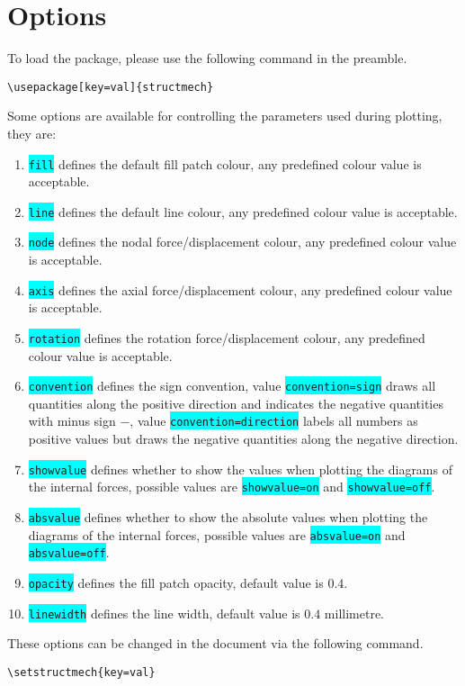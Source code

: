 \documentclass[10pt,a4paper]{article}
\newcommand*{\Highlight}[1]{\colorbox{cyan}{\color{red}\texttt{#1}}}
\begin{document}
\section{Options}
To load the package, please use the following command in the preamble.
\begin{Verbatim}[frame=single,label=Syntax]
\usepackage[key=val]{structmech}
\end{Verbatim}
Some options are available for controlling the parameters used during plotting, they are:
\begin{enumerate}
\item \Highlight{fill} defines the default fill patch colour, any predefined colour value is acceptable.
\item \Highlight{line} defines the default line colour, any predefined colour value is acceptable.
\item \Highlight{node} defines the nodal force/displacement colour, any predefined colour value is acceptable.
\item \Highlight{axis} defines the axial force/displacement colour, any predefined colour value is acceptable.
\item \Highlight{rotation} defines the rotation force/displacement colour, any predefined colour value is acceptable.
\item \Highlight{convention} defines the sign convention, value \Highlight{convention=sign} draws all quantities along the positive direction and indicates the negative quantities with minus sign $-$, value \Highlight{convention=direction} labels all numbers as positive values but draws the negative quantities along the negative direction.
\item \Highlight{showvalue} defines whether to show the values when plotting the diagrams of the internal forces, possible values are \Highlight{showvalue=on} and \Highlight{showvalue=off}.
\item \Highlight{absvalue} defines whether to show the absolute values when plotting the diagrams of the internal forces, possible values are \Highlight{absvalue=on} and \Highlight{absvalue=off}.
\item \Highlight{opacity} defines the fill patch opacity, default value is $0.4$.
\item \Highlight{linewidth} defines the line width, default value is $0.4$ millimetre.
\end{enumerate}
These options can be changed in the document via the following command.
\begin{Verbatim}[frame=single,label=Syntax]
\setstructmech{key=val}
\end{Verbatim}
\end{document}
